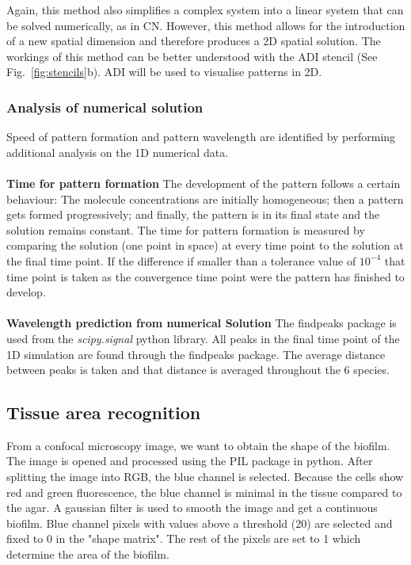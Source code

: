 Again, this method also simplifies a complex system into a linear system that can be solved numerically, as in \acrshort{CN}. However, this method allows for the introduction of a new spatial dimension and therefore produces a 2D spatial solution. The workings of this method can be better understood with the \acrshort{ADI} stencil (See Fig.~\ref{fig:stencils}b). \acrshort{ADI} will be used to visualise patterns in 2D.
\subsubsection{Analysis of numerical solution}
Speed of pattern formation and pattern wavelength are identified by performing additional analysis on the 1D numerical data.  \\\\
\textbf{Time for pattern formation}
The development of the pattern follows a certain behaviour: The molecule concentrations are initially homogeneous; then a pattern gets formed progressively; and finally, the pattern is in its final state and the solution remains constant.  The time for pattern formation is measured by comparing the solution (one point in space) at every time point to the solution at the final time point. If the difference if smaller than a tolerance value of $10^{-4}$ that time point is taken as the convergence time point were the pattern has finished to  develop. \\\\
\textbf{Wavelength prediction from numerical Solution}
The findpeaks package is used from the \textit{scipy.signal} python library. All peaks in the final time point of the 1D simulation are found through the findpeaks package. The average distance between peaks is taken and that distance is averaged throughout the 6 species.


\subsection{Tissue area recognition}\label{Tissue area recognition}
From a confocal microscopy image, we want to obtain the shape of the biofilm.
The image is opened and processed using the PIL package in python.
After splitting the image into RGB, the blue channel is selected.
Because the cells show red and green fluorescence, the blue channel is minimal in the tissue compared to the agar.
A gaussian filter is used to smooth the image and get a continuous biofilm.
Blue channel pixels with values above a threshold (20) are selected and fixed to 0 in the "shape matrix".
The rest of the pixels are set to 1 which determine the area of the biofilm.

